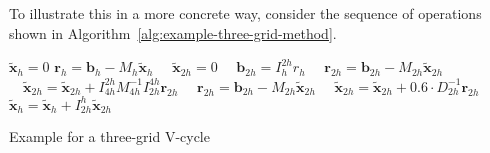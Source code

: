 To illustrate this in a more concrete way, consider the sequence of operations shown in Algorithm~\ref{alg:example-three-grid-method}.
\begin{algorithm}
	\begin{algorithmic}[1]
		\State $\tilde{\bm{x}}_{h} = 0$
		\State $\bm{r}_{h} = \bm{b}_{h} - M_h \tilde{\bm{x}}_{h} $
		\State $\quad \tilde{\bm{x}}_{2h} = 0$
		\State $\quad \bm{b}_{2h} = I_{h}^{2h} r_{h}$
		\State $\quad \bm{r}_{2h} = \bm{b}_{2h} - M_{2h} \tilde{\bm{x}}_{2h}$
		\State $\quad \tilde{\bm{x}}_{2h} = \tilde{\bm{x}}_{2h} + I_{4h}^{2h} M_{4h}^{-1} I_{2h}^{4h} \bm{r}_{2h}$
		\State $\quad \bm{r}_{2h} = \bm{b}_{2h} - M_{2h} \tilde{\bm{x}}_{2h}$
		\State $\quad \tilde{\bm{x}}_{2h} = \tilde{\bm{x}}_{2h} + 0.6 \cdot D_{2h}^{-1} \bm{r}_{2h}$
		\State $\tilde{\bm{x}}_{h} = \tilde{\bm{x}}_{h}  + I_{2h}^h \tilde{\bm{x}}_{2h}$
	\end{algorithmic}
\caption{Example for a three-grid V-cycle}
\label{alg:example-three-grid-method}
\end{algorithm}



